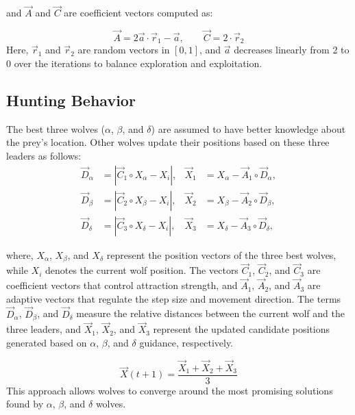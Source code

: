 \documentclass[12pt,a4paper]{article}
\begin{document}
and $\vec{A}$ and $\vec{C}$ are coefficient vectors computed as:


\begin{equation}
\vec{A} = 2 \vec{a} \cdot \vec{r}_1 - \vec{a}, \qquad
\vec{C} = 2 \cdot \vec{r}_2
\label{eq:gwo_coeff}
\end{equation}
Here, $\vec{r}_1$ and $\vec{r}_2$ are random vectors in $[0,1]$, and $\vec{a}$ decreases linearly from 2 to 0 over the iterations to balance exploration and exploitation.

\subsection{Hunting Behavior}
The best three wolves ($\alpha$, $\beta$, and $\delta$) are assumed to have better knowledge about the prey’s location. Other wolves update their positions based on these three leaders as follows:
\begin{align}
\vec{D}_{\alpha} &= | \vec{C}_1 \circ X_{\alpha} - X_i|, &
\vec{X}_1 &= X_{\alpha} - \vec{A}_1 \circ \vec{D}_{\alpha},\\
\vec{D}_{\beta} &= | \vec{C}_2 \circ X_{\beta} - X_i|, &
\vec{X}_2 &= X_{\beta} - \vec{A}_2 \circ \vec{D}_{\beta},\\
\vec{D}_{\delta} &= | \vec{C}_3 \circ X_{\delta} - X_i|, &
\vec{X}_3 &= X_{\delta} - \vec{A}_3 \circ \vec{D}_{\delta},
\end{align}

where, $X_{\alpha}$, $X_{\beta}$, and $X_{\delta}$ represent the position vectors of the three best wolves, while $X_i$ denotes the current wolf position. The vectors $\vec{C}_1$, $\vec{C}_2$, and $\vec{C}_3$ are coefficient vectors that control attraction strength, and $\vec{A}_1$, $\vec{A}_2$, and $\vec{A}_3$ are adaptive vectors that regulate the step size and movement direction. The terms $\vec{D}_{\alpha}$, $\vec{D}_{\beta}$, and $\vec{D}_{\delta}$ measure the relative distances between the current wolf and the three leaders, and $\vec{X}_1$, $\vec{X}_2$, and $\vec{X}_3$ represent the updated candidate positions generated based on $\alpha$, $\beta$, and $\delta$ guidance, respectively.


\begin{equation}
\vec{X}(t+1) = \frac{\vec{X}_1 + \vec{X}_2 + \vec{X}_3}{3}
\label{eq:gwo_position_update}
\end{equation}
This approach allows wolves to converge around the most promising solutions found by $\alpha$, $\beta$, and $\delta$ wolves.
\end{document}
